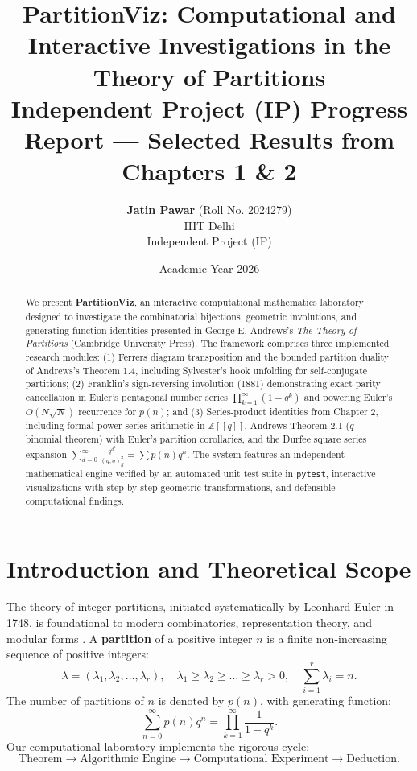 \documentclass[11pt,a4paper]{article}
\title{\textbf{PartitionViz: Computational and Interactive Investigations in the Theory of Partitions}\\
\large Independent Project (IP) Progress Report --- Selected Results from Chapters 1 \& 2}
\author{\textbf{Jatin Pawar} (Roll No. 2024279)\\
IIIT Delhi\\
Independent Project (IP)}
\date{Academic Year 2026}
\begin{document}
\maketitle

\begin{abstract}
We present \textbf{PartitionViz}, an interactive computational mathematics laboratory designed to investigate the combinatorial bijections, geometric involutions, and generating function identities presented in George E. Andrews's \emph{The Theory of Partitions} (Cambridge University Press). The framework comprises three implemented research modules: (1) Ferrers diagram transposition and the bounded partition duality of Andrews's Theorem 1.4, including Sylvester's hook unfolding for self-conjugate partitions; (2) Franklin's sign-reversing involution (1881) demonstrating exact parity cancellation in Euler's pentagonal number series $\prod_{k=1}^\infty (1-q^k)$ and powering Euler's $O(N\sqrt{N})$ recurrence for $p(n)$; and (3) Series-product identities from Chapter 2, including formal power series arithmetic in $\mathbb{Z}[[q]]$, Andrews Theorem 2.1 ($q$-binomial theorem) with Euler's partition corollaries, and the Durfee square series expansion $\sum_{d=0}^\infty \frac{q^{d^2}}{(q; q)_d^2} = \sum p(n) q^n$. The system features an independent mathematical engine verified by an automated unit test suite in \texttt{pytest}, interactive visualizations with step-by-step geometric transformations, and defensible computational findings.
\end{abstract}

\section{Introduction and Theoretical Scope}
The theory of integer partitions, initiated systematically by Leonhard Euler in 1748, is foundational to modern combinatorics, representation theory, and modular forms \cite{andrews1976}. A \textbf{partition} of a positive integer $n$ is a finite non-increasing sequence of positive integers:
\begin{equation}
\lambda = (\lambda_1, \lambda_2, \dots, \lambda_r), \quad \lambda_1 \ge \lambda_2 \ge \dots \ge \lambda_r > 0, \quad \sum_{i=1}^r \lambda_i = n.
\end{equation}
The number of partitions of $n$ is denoted by $p(n)$, with generating function:
\begin{equation}
\sum_{n=0}^\infty p(n) q^n = \prod_{k=1}^\infty \frac{1}{1 - q^k}.
\end{equation}
Our computational laboratory implements the rigorous cycle:
\begin{equation*}
\text{Theorem} \longrightarrow \text{Algorithmic Engine} \longrightarrow \text{Computational Experiment} \longrightarrow \text{Deduction}.
\end{equation*}
\end{document}
